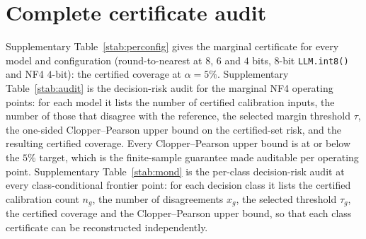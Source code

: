 \documentclass[11pt]{article}
\theoremstyle{plain}
\begin{document}
\section{Complete certificate audit}
Supplementary Table~\ref{stab:perconfig} gives the marginal certificate for every model and
configuration (round-to-nearest at $8$, $6$ and $4$ bits, $8$-bit \texttt{LLM.int8()} and NF4 $4$-bit): the
certified coverage at $\alpha=5\%$. Supplementary
Table~\ref{stab:audit} is the decision-risk audit for the marginal NF4 operating points: for each
model it lists the number of certified calibration inputs, the number of those that disagree with the
reference, the selected margin threshold $\tau$, the one-sided Clopper--Pearson upper bound on the
certified-set risk, and the resulting certified coverage. Every Clopper--Pearson upper bound is at or
below the $5\%$ target, which is the finite-sample guarantee made auditable per operating point.
Supplementary Table~\ref{stab:mond} is the per-class decision-risk audit at every class-conditional
frontier point: for each decision class it lists the certified calibration count $n_g$, the number of
disagreements $x_g$, the selected threshold $\tau_g$, the certified coverage and the
Clopper--Pearson upper bound, so that each class certificate can be reconstructed independently.

\begin{table}[h]\centering\small
\caption{\textbf{Per-configuration marginal certificate.} Each cell is certified coverage (\%) with a
patient-clustered $95\%$ bootstrap confidence interval, at $\alpha=5\%$, $\delta=0.10$. The point
estimate is the certified test coverage and the brackets are patient-clustered $95\%$ bootstrap
intervals for that coverage; the formal risk certificate is the Clopper--Pearson upper bound
(Table~\ref{stab:audit}), not the bootstrap interval. INT8 fails on two BF16-native $70$B checkpoints,
which the certificate flags as $0\%$ coverage.}
\label{stab:perconfig}
\setlength{\tabcolsep}{4pt}
\end{table}
\end{document}
